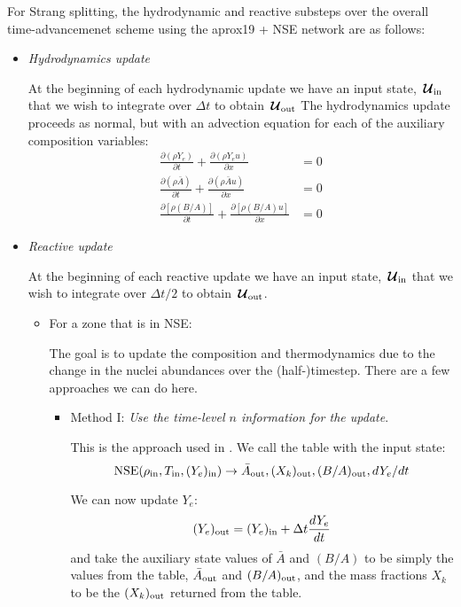 \documentclass[times,modern]{aastex63}
\newcommand{\ddx}[1]{{\frac{{\partial#1}}{\partial x}}}
\newcommand{\ddt}[1]{{\frac{{\partial#1}}{\partial t}}}
\newcommand{\Uc}{{\,\bm{\mathcal{U}}}}
\newcommand{\nse}[1]{{\mathrm{NSE}( #1 )}}
\newcommand{\out}{{\rm out}}
\begin{document}
For Strang splitting, the hydrodynamic and reactive substeps over
the overall time-advancemenet scheme using the aprox19 + NSE network
are as follows:
\begin{itemize}

\item {\em Hydrodynamics update}
  
  At the beginning of each hydrodynamic update we have an input state,
  $\Uc_{\rm in}$ that we wish to integrate over $\Delta t$ to obtain $\Uc_{\rm out}$
  The hydrodynamics update proceeds as normal, but with an advection
  equation for each of the auxiliary composition variables:
  \begin{align}
    \ddt{(\rho Y_e)} + \ddx{(\rho Y_e u)} &= 0 \\
    \ddt{(\rho \bar{A})} + \ddx{(\rho \bar{A} u)} &= 0 \\
    \ddt{[\rho (B/A)]} + \ddx{[\rho (B/A) u]} &= 0 
  \end{align}


\item {\em Reactive update}

  At the beginning of each reactive update we have an input state,
  $\Uc_{\rm in}$ that we wish to integrate over $\Delta t/2$ to obtain $\Uc_{\rm out}$.
  
  \begin{itemize}

    \item For a zone that is in NSE:

      The goal is to update the composition and thermodynamics due to the 
      change in the nuclei abundances over the (half-)timestep.  There are
      a few approaches we can do here.

      \begin{itemize}
      \item Method I: {\em Use the time-level $n$ information for the update}.

        This is the approach used in \citet{ma:2013}.  We call the table with the 
        input state:
        \begin{equation}
          \nse{\rho_{\rm in}, T_{\rm in}, (Y_e)_{\rm in}} \rightarrow \bar{A}_\out, (X_k)_\out, (B/A)_\out, dY_e/dt
        \end{equation}

        We can now update $Y_e$:
        \begin{equation}
          (Y_e)_{\rm out} = (Y_e)_{\rm in} + \Delta t \frac{dY_e}{dt}
        \end{equation}
        and take the auxiliary state values of $\bar{A}$ and $(B/A)$ to be simply
        the values from the table, $\bar{A}_\out$ and $(B/A)_\out$, and the mass fractions
        $X_k$ to be the $(X_k)_{\rm out}$ returned from the table.


\end{itemize}
\end{itemize}
\end{itemize}
\end{document}
